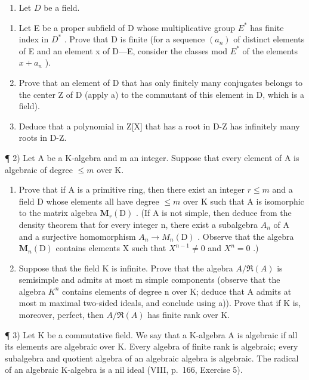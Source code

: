 
\begin{enumerate}
\def\labelenumi{\arabic{enumi})}
\tightlist
\item
  Let \(D\) be a field.
\end{enumerate}

\begin{enumerate}
\def\labelenumi{\alph{enumi})}
\item
  Let E be a proper subfield of D whose multiplicative group \(E^{*}\) has finite index in \(D^{*}\) . Prove that D is finite (for a sequence \((a_{n})\) of distinct elements of E and an element x of D---E, consider the classes mod \(E^{*}\) of the elements \(x + a_{n}\) ).
\item
  Prove that an element of D that has only finitely many conjugates belongs to the center Z of D (apply a) to the commutant of this element in D, which is a field).
\item
  Deduce that a polynomial in Z{[}X{]} that has a root in D-Z has infinitely many roots in D-Z.
\end{enumerate}

¶ 2) Let A be a K-algebra and m an integer. Suppose that every element of A is algebraic of degree \(\leqslant m\) over K.

\begin{enumerate}
\def\labelenumi{\alph{enumi})}
\item
  Prove that if A is a primitive ring, then there exist an integer \(r \leqslant m\) and a field D whose elements all have degree \(\leqslant m\) over K such that A is isomorphic to the matrix algebra \(\mathbf{M}_{r}(\mathrm{D})\) . (If A is not simple, then deduce from the density theorem that for every integer n, there exist a subalgebra \(A_{n}\) of A and a surjective homomorphism \(A_{n} \to M_{n}(\mathrm{D})\) . Observe that the algebra \(\mathbf{M}_{n}(\mathrm{D})\) contains elements X such that \(X^{n-1} \neq 0\) and \(X^{n} = 0\) .)
\item
  Suppose that the field K is infinite. Prove that the algebra \(A/\Re(A)\) is semisimple and admits at most m simple components (observe that the algebra \(K^{n}\) contains elements of degree n over K; deduce that A admits at most m maximal two-sided ideals, and conclude using a)). Prove that if K is, moreover, perfect, then \(A/\Re(A)\) has finite rank over K.
\end{enumerate}

¶ 3) Let K be a commutative field. We say that a K-algebra A is algebraic if all its elements are algebraic over K. Every algebra of finite rank is algebraic; every subalgebra and quotient algebra of an algebraic algebra is algebraic. The radical of an algebraic K-algebra is a nil ideal (VIII, p.~166, Exercise 5).

